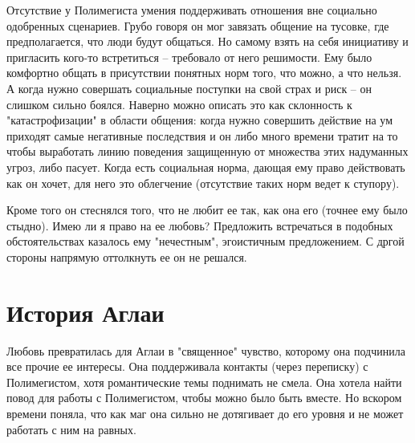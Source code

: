 \documentclass[12pt,a4paper]{article}
\begin{document}
Отсутствие у Полимегиста умения поддерживать отношения вне социально одобренных сценариев. Грубо говоря он мог завязать общение на тусовке, где предполагается, что люди будут общаться. Но самому взять на себя инициативу и пригласить кого-то встретиться -- требовало от него решимости. Ему было комфортно общать в присутствии понятных норм того, что можно, а что нельзя. А когда нужно совершать социальные поступки на свой страх и риск -- он слишком сильно боялся. Наверно можно описать это как склонность к "катастрофизации" в области общения: когда нужно совершить действие на ум приходят самые негативные последствия и он либо много времени тратит на то чтобы выработать линию поведения защищенную от множества этих надуманных угроз, либо пасует. Когда есть социальная норма, дающая ему право действовать как он хочет, для него это облегчение (отсутствие таких норм ведет к ступору).

Кроме того он стеснялся того, что не любит ее так, как она его (точнее ему было стыдно). Имею ли я право на ее любовь? Предложить встречаться в подобных обстоятельствах казалось ему "нечестным", эгоистичным предложением. С дргой стороны напрямую оттолкнуть ее он не решался.

\section*{История Аглаи}
Любовь превратилась для Аглаи в "священное" чувство, которому она подчинила все прочие ее интересы. Она поддерживала контакты (через переписку) с Полимегистом, хотя романтические темы поднимать не смела.
Она хотела найти повод для работы с Полимегистом, чтобы можно было быть вместе. Но вскором времени поняла, что как маг она сильно не дотягивает до его уровня и не может работать с ним на равных.
\end{document}
